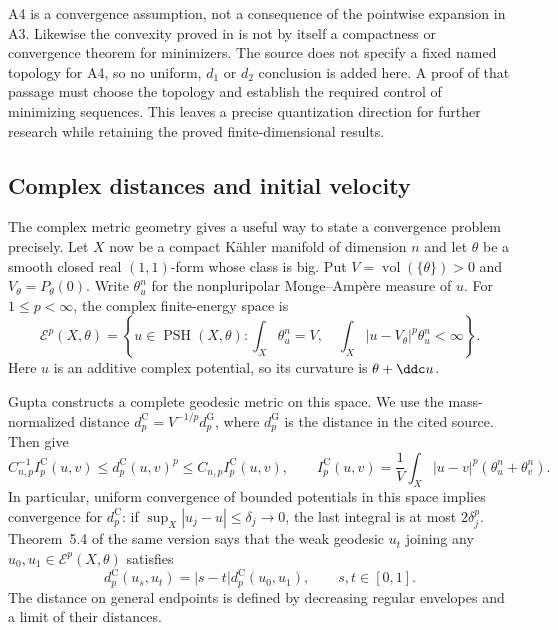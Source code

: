 A4 is a convergence assumption, not a consequence of the pointwise
expansion in A3. Likewise the convexity proved in
\cite[Proposition~47]{Yao25MaximalDestabilizers} is not by itself
a compactness or convergence theorem for minimizers. The source
does not specify a fixed named topology for A4, so no uniform,
$d_1$ or $d_2$ conclusion is added here. A proof of that passage
must choose the topology and establish the required control of
minimizing sequences. This leaves a precise quantization direction
for further research while retaining the proved finite-dimensional
results.

\subsection{Complex distances and initial velocity}
\label{sec:ytd-complex-distance-regularity}

The complex metric geometry gives a useful way to state a convergence
problem precisely. Let $X$ now be a compact K\"ahler manifold of
dimension $n$ and let $\theta$ be a smooth closed real $(1,1)$-form
whose class is big. Put $V=\operatorname{vol}(\{\theta\})>0$ and
$V_\theta=P_\theta(0)$. Write $\theta_u^n$ for the nonpluripolar
Monge--Amp\`ere measure of $u$. For $1\leq p<\infty$, the complex
finite-energy space is
\[
 \mathcal E^p(X,\theta)=
 \left\{u\in\operatorname{PSH}(X,\theta):
   \int_X\theta_u^n=V,\quad
   \int_X|u-V_\theta|^p\theta_u^n<\infty\right\}.
\]
Here $u$ is an additive complex potential, so its curvature is
$\theta+\ddc u$.

Gupta constructs a complete geodesic metric on this space. We use
the mass-normalized distance $d_p^{\mathrm C}=V^{-1/p}d_p^{\mathrm G}$,
where $d_p^{\mathrm G}$ is the distance in the cited source. Then
\cite[Definition~4.10, Lemma~4.12 and Theorem~5.1]{Gupta24GeodesicV1}
give
\[
 C_{n,p}^{-1}I_p^{\mathrm C}(u,v)
 \leq d_p^{\mathrm C}(u,v)^p
 \leq C_{n,p}I_p^{\mathrm C}(u,v),\qquad
 I_p^{\mathrm C}(u,v)=\frac1V
       \int_X|u-v|^p(\theta_u^n+\theta_v^n).
\]
In particular, uniform convergence of bounded potentials in this space
implies convergence for $d_p^{\mathrm C}$: if
$\sup_X|u_j-u|\leq\delta_j\to0$, the last integral is at most
$2\delta_j^p$.
Theorem~5.4 of the same version says that the weak geodesic $u_t$
joining any $u_0,u_1\in\mathcal E^p(X,\theta)$ satisfies
\[
 d_p^{\mathrm C}(u_s,u_t)=|s-t|d_p^{\mathrm C}(u_0,u_1),
 \qquad s,t\in[0,1].
\]
The distance on general endpoints is defined by decreasing regular
envelopes and a limit of their distances.

